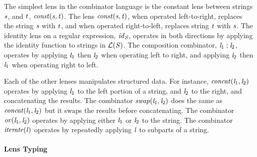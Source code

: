 \documentclass[acmsmall]{acmart}
\begin{document}
The simplest lens in the combinator language is the constant lens between
strings $\mathit{s}$, and $\mathit{t}$, $\mathit{const}(\mathit{s},\mathit{t})$.
The lens $\mathit{const}(\mathit{s},\mathit{t})$, when operated left-to-right,
replaces the string $\mathit{s}$ with $\mathit{t}$, and when operated
right-to-left, replaces string $\mathit{t}$ with $\mathit{s}$.  The identity lens
on a regular expression, $\mathit{id}_{\mathit{S}}$, operates in both
directions by applying the
identity function to strings in $\mathcal{L}(\mathit{S})$.  The composition
combinator, 
$\mathit{l}_1\mathrel{;}\mathit{l}_2$, operates by applying $\mathit{l}_1$ then $\mathit{l}_2$
when operating left to right, and applying $\mathit{l}_2$ then $\mathit{l}_1$ when
operating right to left.

Each of the other lenses manipulates structured data.  For instance,
$\mathit{concat}(\mathit{l}_1,\mathit{l}_2)$ operates by applying $\mathit{l}_1$ to the left
portion of a string, and $\mathit{l}_2$ to the right, and concatenating the results.
The combinator
$\mathit{swap}(\mathit{l}_1,\mathit{l}_2)$ does the same as $\mathit{concat}(\mathit{l}_1,\mathit{l}_2)$
but it swaps the results before concatenating.
The combinator $\mathit{or}(\mathit{l}_1,\mathit{l}_2)$ operates by applying either $\mathit{l}_1$ or $\mathit{l}_2$
to the string.  The combinator $\mathit{\mathit{iterate}(\mathit{l})}$ operates by repeatedly
applying $\mathit{l}$ to subparts of a string.

\paragraph{Lens Typing}
\end{document}
